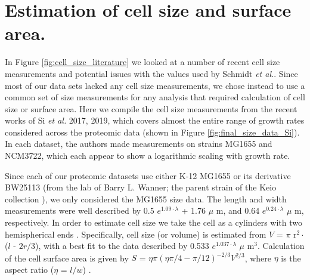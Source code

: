 \section{Estimation of cell size and surface area.}

In Figure \ref{fig:cell_size_literature} we looked at a number of recent cell
size measurements and potential issues with the values used by Schmidt
\textit{et al.}. Since most of our data sets lacked any cell size measurements,
we chose instead to use a common set of size measurements for any analysis
that required calculation of cell size or surface area. Here we compile the
cell size measurements from the recent works of Si \textit{et al.} 2017, 2019,
which covers almost the entire range of growth rates considered across the
proteomic data (shown in Figure \ref{fig:final_size_data_Si}). In each dataset,
the authors made measurements on strains MG1655 and NCM3722, which each appear
to show a logarithmic scaling with growth rate.

Since each of our proteomic datasets use either K-12 MG1655 or its derivative
BW25113 (from the lab of Barry L. Wanner; the parent strain of the Keio
collection \cite{datsenko2000, baba2006}), we only considered the MG1655 size data. The
length and width measurements  were well described by 0.5 $e^{1.09 \cdot
\lambda}$ + 1.76 $\mu$ m, and 0.64 $e^{0.24 \cdot \lambda}$ $\mu$ m,
respectively. In order to estimate cell size we take the cell as a cylinders
with two hemispherical ends \cite{si2017, basan2015}. Specifically,  cell size
(or volume) is estimated from $V$ = $\pi$ r$^2 \cdot$ ($l$ - $2r/3$), with a
best fit to the data described by 0.533 $e^{1.037 \cdot \lambda}$ $\mu$ m$^3$.
Calculation of the cell surface area is given by $S$ = $\eta \pi (\eta \pi / 4 -
\pi/12)^{-2/3} V^{2/3}$, where $\eta$ is the aspect ratio ($\eta$ = $l/w$)
\cite{ojkic2019}.

